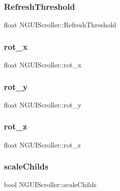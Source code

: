 \subsubsection{\texorpdfstring{Refresh\+Threshold}{RefreshThreshold}}
{\footnotesize\ttfamily float N\+G\+U\+I\+Scroller\+::\+Refresh\+Threshold}

\hypertarget{class_n_g_u_i_scroller_adb85b565120231a481be1694323c2d57}{}\label{class_n_g_u_i_scroller_adb85b565120231a481be1694323c2d57} 
\subsubsection{\texorpdfstring{rot\+\_\+x}{rot\_x}}
{\footnotesize\ttfamily float N\+G\+U\+I\+Scroller\+::rot\+\_\+x}

\hypertarget{class_n_g_u_i_scroller_a2102debbae8661d4cca483635666e4f1}{}\label{class_n_g_u_i_scroller_a2102debbae8661d4cca483635666e4f1} 
\subsubsection{\texorpdfstring{rot\+\_\+y}{rot\_y}}
{\footnotesize\ttfamily float N\+G\+U\+I\+Scroller\+::rot\+\_\+y}

\hypertarget{class_n_g_u_i_scroller_a7325daee12c10c7f083311a6c452ce73}{}\label{class_n_g_u_i_scroller_a7325daee12c10c7f083311a6c452ce73} 
\subsubsection{\texorpdfstring{rot\+\_\+z}{rot\_z}}
{\footnotesize\ttfamily float N\+G\+U\+I\+Scroller\+::rot\+\_\+z}

\hypertarget{class_n_g_u_i_scroller_a68a8399072294b45a93a151555e62eb7}{}\label{class_n_g_u_i_scroller_a68a8399072294b45a93a151555e62eb7} 
\subsubsection{\texorpdfstring{scale\+Childs}{scaleChilds}}
{\footnotesize\ttfamily bool N\+G\+U\+I\+Scroller\+::scale\+Childs}

